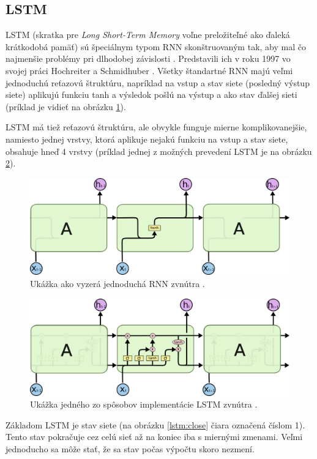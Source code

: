 \subsection{LSTM}
LSTM (skratka pre \textit{Long Short-Term Memory} voľne preložiteľné ako ďaleká krátkodobá pamäť) sú špeciálnym typom RNN skonštruovaným tak, aby mal čo najmenšie problémy pri dlhodobej závislosti \citep{rnn:colah}. 
Predstavili ich v roku 1997 vo svojej práci Hochreiter a Schmidhuber \citep{rnn:hoch}.
Všetky štandartné RNN majú veľmi jednoduchú reťazovú štruktúru, napríklad na vstup a stav siete (posledný výstup siete) aplikujú funkciu tanh a výsledok pošlú na výstup a ako stav ďalšej sieti (príklad je vidieť na obrázku \ref{simple_rnn}). 

LSTM má tiež reťazovú štruktúru, ale obvykle funguje mierne komplikovanejšie, namiesto jednej vrstvy, ktorá aplikuje nejakú funkciu na vstup a stav siete, obsahuje hneď 4 vrstvy (príklad jednej z možných prevedení LSTM je na obrázku \ref{lstm}).
\begin{figure} 
\includegraphics[width=\textwidth]{../img/simple_rnn.png}
\caption{Ukážka ako vyzerá jednoduchá RNN zvnútra \citep{rnn:colah}.}
\label{simple_rnn}
\end{figure}
\begin{figure} 
\includegraphics[width=\textwidth]{../img/lstm.png}
\caption{Ukážka jedného zo spôsobov implementácie LSTM zvnútra \citep{rnn:colah}.}
\label{lstm}
\end{figure}

Základom LSTM je stav siete (na obrázku \ref{lstm:close} čiara označená číslom 1).
Tento stav pokračuje cez celú sieť až na koniec iba s miernými zmenami.
Veľmi jednoducho sa môže stať, že sa stav počas výpočtu skoro nezmení.

